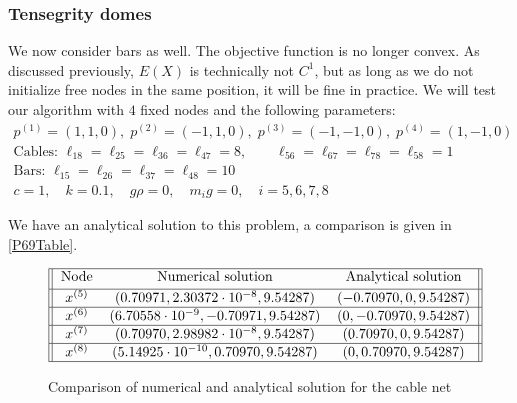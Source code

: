 \subsubsection{Tensegrity domes}
We now consider bars as well. The objective function is no longer convex. As discussed previously, $E(X)$ is technically not $C^1$, but as long as we do not initialize free nodes in the same position, it will be fine in practice. We will test our algorithm with $4$ fixed nodes and the following parameters:
\begin{equation*}
    \begin{gathered}
    p^{(1)} = (1,1,0),\; p^{(2)} = (-1,1,0),\; p^{(3)} = (-1,-1,0),\; p^{(4)} = (1,-1,0)\\
    \text{Cables: } \ell_{18} = \ell_{25} = \ell_{36} = \ell_{47} = 8, \qquad \ell_{56} = \ell_{67} = \ell_{78} = \ell_{58} = 1\\
    \text{Bars: }\ell_{15} = \ell_{26} = \ell_{37} = \ell_{48} = 10\\
    c=1, \quad k= 0.1, \quad g \rho = 0,\quad m_i g = 0, \quad i = 5,6,7,8
    \end{gathered}
\end{equation*}

We have an analytical solution to this problem, a comparison is given in \eqref{P69Table}. 
\begin{figure}
\caption{Comparison of numerical and analytical solution for the cable net}
\begin{gather}   
\label{P69Table}
\begin{tabular}{||c c c||} 
 \hline
 Node & Numerical solution & Analytical solution \\ [0.5ex] 
 \hline
$x^{(5)}$ & $(0.70971,2.30372 \cdot 10^{-8},9.54287)$ & $(-0.70970,0,9.54287)$  \\ 
 \hline
 $x^{(6)}$ & $(6.70558 \cdot 10^{-9},-0.70971,9.54287)$& $(0,-0.70970,9.54287)$  \\ 
 \hline
 $x^{(7)}$ & $(0.70970,2.98982 \cdot 10^{-8},9.54287)$ & $(0.70970,0,9.54287)$\\ 
 \hline
 $x^{(8)}$ & $(5.14925 \cdot 10^{-10},0.70970,9.54287)$ & $(0,0.70970,9.54287)$ \\ 
 \hline
\end{tabular}
\end{gather}
\end{figure}

